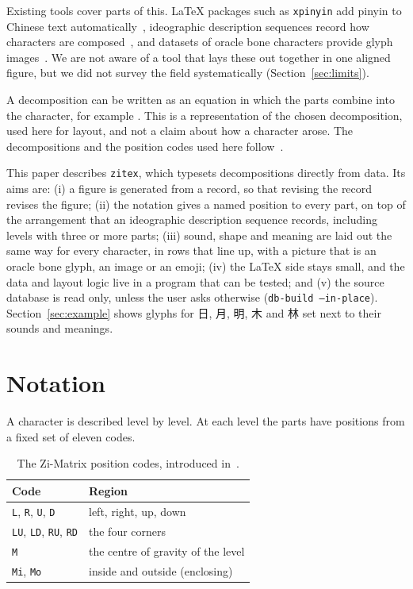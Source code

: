 \documentclass[11pt]{article}
\begin{document}
Existing tools cover parts of this. LaTeX packages such as \texttt{xpinyin} add pinyin to Chinese text automatically~\cite{xpinyin},
ideographic description sequences record how characters are composed~\cite{cjkviids}, and datasets of oracle bone characters provide glyph
images~\cite{hustobc,evobc}. We are not aware of a tool that lays these out together in one aligned figure, but we did not survey the field
systematically (Section~\ref{sec:limits}).

A decomposition can be written as an equation in which the parts combine into the character, for example
\unskip. This is a representation of the chosen decomposition, used here for layout, and not a claim about how a character
arose. The decompositions and the position codes used here follow~\cite{gong2025}.

This paper describes \texttt{zitex}, which typesets decompositions directly from data. Its aims are: (i) a figure is generated
from a record, so that revising the record revises the figure; (ii) the notation gives a named position to every part, on top of the arrangement that an ideographic description sequence records,
including levels with three or more parts; (iii) sound, shape and meaning are laid out the same way for every character, in rows that line up, with
a picture that is an oracle bone glyph, an image or an emoji; (iv) the \LaTeX{} side stays small, and the data and layout logic live in
a program that can be tested; and (v) the source database is read only, unless the user asks otherwise (\texttt{db-build --in-place}). Section~\ref{sec:example} shows glyphs for 日, 月, 明, 木 and 林
set next to their sounds and meanings.

\section{Notation}
A character is described level by level. At each level the parts have positions from a fixed set of eleven codes.

\begin{table}[ht]
\centering\small
\begin{tabular}{@{}ll@{}}
\toprule
Code & Region \\
\midrule
\texttt{L}, \texttt{R}, \texttt{U}, \texttt{D} & left, right, up, down \\
\texttt{LU}, \texttt{LD}, \texttt{RU}, \texttt{RD} & the four corners \\
\texttt{M} & the centre of gravity of the level \\
\texttt{Mi}, \texttt{Mo} & inside and outside (enclosing) \\
\bottomrule
\end{tabular}
\caption{The Zi-Matrix position codes, introduced in~\cite{gong2025}.}
\label{tab:codes}
\end{table}
\end{document}
